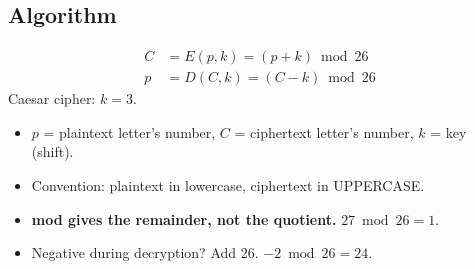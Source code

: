 \subsection{Algorithm}
\begin{minipage}[c]{0.55\textwidth}
\begin{keybox}[title=Encryption and decryption]
\vspace{-6pt}
\begin{align*}
C &= E(p,k) = (p + k) \bmod 26\\
p &= D(C,k) = (C - k) \bmod 26
\end{align*}
Caesar cipher: $k = 3$.
\end{keybox}
\begin{itemize}
  \item $p$ = plaintext letter's number, $C$ = ciphertext letter's number, $k$ = key (shift).
  \item Convention: plaintext in lowercase, ciphertext in UPPERCASE.
  \item \textbf{mod gives the remainder, not the quotient.} $27 \bmod 26 = 1$.
  \item Negative during decryption? Add 26. \;$-2 \bmod 26 = 24$.
\end{itemize}
\end{minipage}\hfill
\begin{minipage}[c]{0.42\textwidth}
\centering
{}
\end{minipage}

